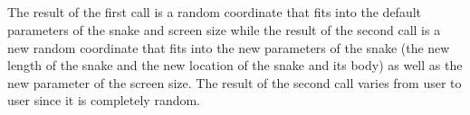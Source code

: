 \documentclass{article}
\begin{document}
\subsection{}
The result of the first call is a random coordinate that fits into the default parameters of the snake and screen size while the result of the second call is a new random coordinate that fits into the new parameters of the snake (the new length of the snake and the new location of the snake and its body) as well as the new parameter of the screen size. The result of the second call varies from user to user since it is completely random.
\end{document}

